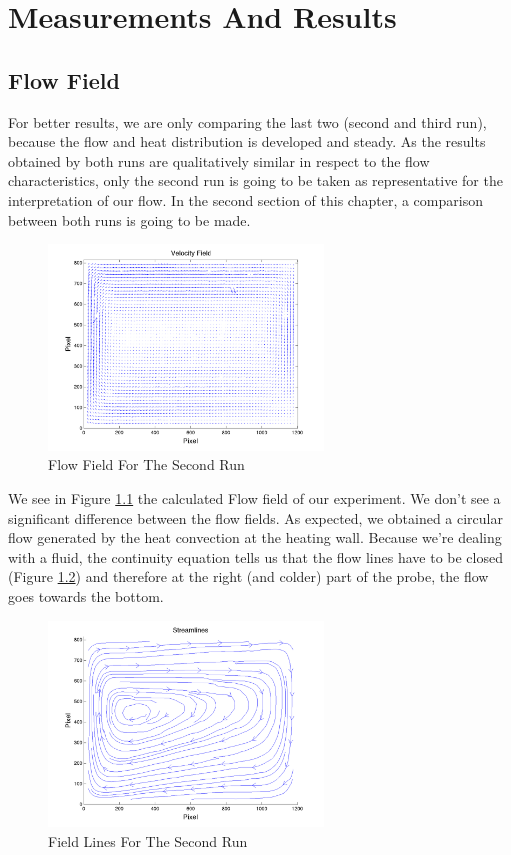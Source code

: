 \chapter{Measurements And Results}\label{sec:results}

\section{Flow Field}

For better results, we are only comparing the last two (second and third run), because the flow and heat distribution is developed and steady.  As the results obtained by both runs are qualitatively similar in respect to the flow characteristics, only the second run is going to be taken as representative for the interpretation of our flow. In the second section of this chapter, a comparison between both runs is going to be made.

\begin{figure}[H]
\centering
\includegraphics[width=0.65\textwidth]{pics/figure2_run2.png}
\caption{Flow Field For The Second Run}
\label{pic:2r2}
\end{figure}

We see in Figure \ref{pic:2r2} the calculated Flow field of our experiment. We don't see a significant difference between the flow fields. As expected, we obtained a circular flow generated by the heat convection at the heating wall. Because we're dealing with a fluid, the continuity equation tells us that the flow lines have to be closed (Figure \ref{pic:3r2}) and therefore at the right (and colder) part of the probe, the flow goes towards the bottom. \\


\begin{figure}[H]
\centering
\includegraphics[width=0.65\textwidth]{pics/figure3_run2.png}
\caption{Field Lines For The Second Run }
\label{pic:3r2}
\end{figure}

